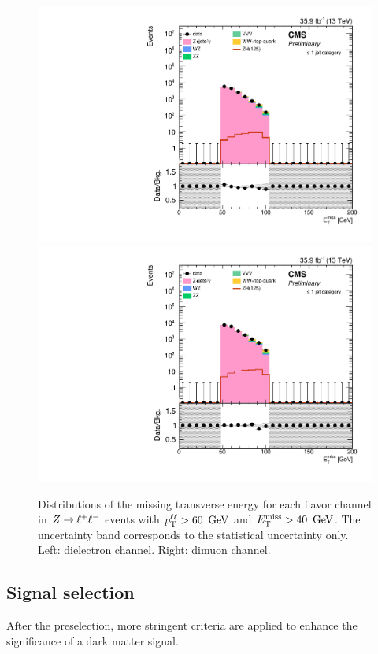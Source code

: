 \begin{figure}[!hbtp]
\begin{center}
\includegraphics[width=\cmsFigWidth]{figures/presel_met_ee.pdf}
\includegraphics[width=\cmsFigWidth]{figures/presel_met_mm.pdf}
\caption{
  Distributions of the missing transverse energy for each flavor channel in $Z\to\ell^+\ell^-$ events with $p_{\mathrm{T}}^{\ell\ell} > 60~\,\text{Ge\hspace{-.08em}V}$ and $E_\mathrm{T}^{\mathrm{miss}} > 40~\,\text{Ge\hspace{-.08em}V}$.
  The uncertainty band corresponds to the statistical uncertainty only. Left: dielectron channel. Right: dimuon channel.
}
\label{fig:distributions_presel_met}
\end{center}
\end{figure}

\subsection{Signal selection}
\label{ss:zlldmsigsel}
After the preselection, more stringent criteria are applied to enhance the significance of a dark matter signal.

